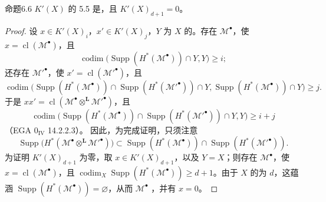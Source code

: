 \begin{SGAresult}{命题}{6.6}
$K'(X)$ 的 5.5 是，且 $K'(X)_{d+1}=0$。
\end{SGAresult}
\begin{proof}
设 $x\in K'(X)_i$，$x'\in K'(X)_j$，$Y$ 为 $X$ 的。存在 $\mathcal M^\bullet$，使 $x=\operatorname{cl}(\mathcal M^\bullet)$，且
\[
\operatorname{codim}\bigl(\operatorname{Supp}(H^*(\mathcal M^\bullet))\cap Y,Y\bigr)\geq i;
\]
还存在 $\mathcal M'^\bullet$，使 $x'=\operatorname{cl}(\mathcal M'^\bullet)$，且
\[
\operatorname{codim}\bigl(\operatorname{Supp}(H^*(\mathcal M^\bullet))\cap\operatorname{Supp}(H^*(\mathcal M'^\bullet))\cap Y,
\operatorname{Supp}(H^*(\mathcal M^\bullet))\cap Y\bigr)\geq j.
\]
于是 $xx'=\operatorname{cl}(\mathcal M^\bullet\mathbin{\otimes^{\mathbf L}}\mathcal M'^\bullet)$，且
\[
\operatorname{codim}\bigl(\operatorname{Supp}(H^*(\mathcal M^\bullet))\cap\operatorname{Supp}(H^*(\mathcal M'^\bullet))\cap Y,Y\bigr)\geq i+j
\]
（EGA $0_{\mathrm{IV}}$ 14.2.2.3）。
因此，为完成证明，只须注意
\[
\operatorname{Supp}\bigl(H^*(\mathcal M^\bullet\mathbin{\otimes^{\mathbf L}}\mathcal M'^\bullet)\bigr)
\subset\operatorname{Supp}(H^*(\mathcal M^\bullet))\cap\operatorname{Supp}(H^*(\mathcal M'^\bullet)).
\]
为证明 $K'(X)_{d+1}$ 为零，取 $x\in K'(X)_{d+1}$，以及 $Y=X$；则存在 $\mathcal M^\bullet$，使 $x=\operatorname{cl}(\mathcal M^\bullet)$，且 $\operatorname{codim}_X\operatorname{Supp}(H^*(\mathcal M^\bullet))\geq d+1$。由于 $X$ 的为 $d$，这蕴涵 $\operatorname{Supp}(H^*(\mathcal M^\bullet))=\varnothing$，从而 $\mathcal M^\bullet$ ，并有 $x=0$。
\end{proof}

